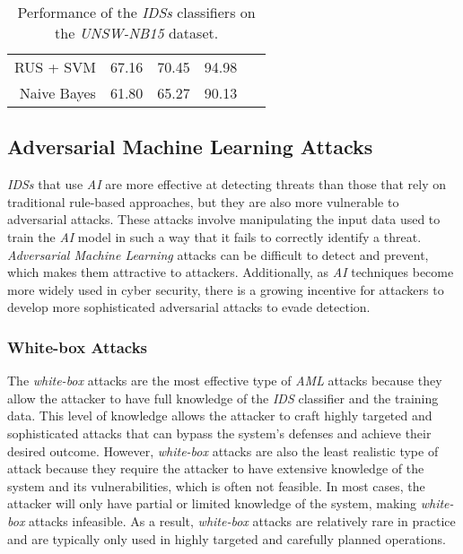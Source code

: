 \begin{table}
{\begin{tabular}{|r|rrr|l|}
            RUS + SVM           & 67.16             & 70.45             & 94.98        & ~\cite{huang2020igan}                                                                            \\
            Naive Bayes         & 61.80             & 65.27             & 90.13        & ~\cite{huang2020igan, maseer2021benchmarking, faker2019}                                         \\ \hline
        \end{tabular}
    }\caption{Performance of the \textit{IDSs} classifiers on the \textit{UNSW-NB15} dataset.\label{tab:ids-classifiers-unsw-nb15}}
\end{table}

\subsection{Adversarial Machine Learning Attacks}\label{subsec:adversarial-machine-learning-attacks}

\textit{IDSs} that use \textit{AI} are more effective at detecting threats than those that rely on traditional
rule-based approaches, but they are also more vulnerable to adversarial attacks.
These attacks involve manipulating the input data used to train the \textit{AI} model in such a way that it fails to
correctly identify a threat.
\textit{Adversarial Machine Learning} attacks can be difficult to detect and prevent, which makes them attractive to
attackers.
Additionally, as \textit{AI} techniques become more widely used in cyber security, there is a growing incentive for
attackers to develop more sophisticated adversarial attacks to evade detection.

\subsubsection{White-box Attacks}\label{subsubsec:white-box-attacks}
The \textit{white-box} attacks are the most effective type of \textit{AML} attacks because they allow the attacker to
have full knowledge of the \textit{IDS} classifier and the training data.
This level of knowledge allows the attacker to craft highly targeted and sophisticated attacks that can bypass the
system's defenses and achieve their desired outcome.
However, \textit{white-box} attacks are also the least realistic type of attack because they require the attacker to
have extensive knowledge of the system and its vulnerabilities, which is often not feasible.
In most cases, the attacker will only have partial or limited knowledge of the system, making \textit{white-box}
attacks infeasible.
As a result, \textit{white-box} attacks are relatively rare in practice and are typically only used in highly targeted
and carefully planned operations.

